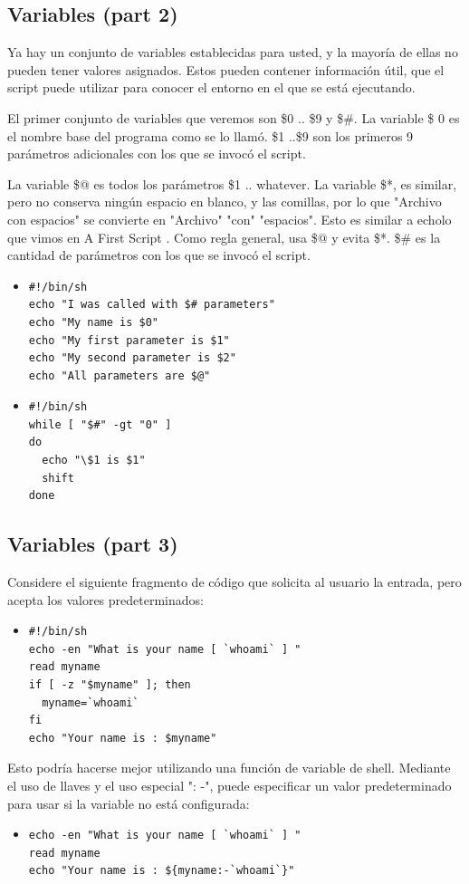 \documentclass[12pt,letterpaper]{article}
\begin{document}
{        \subsection{Variables (part 2)}
        Ya hay un conjunto de variables establecidas para usted, y la mayoría de ellas no pueden tener valores asignados. 
Estos pueden contener información útil, que el script puede utilizar para conocer el entorno en el que se está ejecutando.\par
El primer conjunto de variables que veremos son \$0 .. \$9 y \$\#. 
La variable \$ 0 es el nombre base del programa como se lo llamó.
\$1 ..\$9 son los primeros 9 parámetros adicionales con los que se invocó el script. \par
La variable \$@ es todos los parámetros \$1 .. whatever. La variable \$*, es similar, pero no conserva ningún espacio en blanco, y las comillas, por lo que "Archivo con espacios" se convierte en "Archivo" "con" "espacios". Esto es similar a echolo que vimos en A First Script . Como regla general, usa \$@ y evita \$*.  
\$\# es la cantidad de parámetros con los que se invocó el script.
	\color{red}
        \begin{itemize}
        \item \begin{verbatim}
#!/bin/sh
echo "I was called with $# parameters"
echo "My name is $0"
echo "My first parameter is $1"
echo "My second parameter is $2"
echo "All parameters are $@"
        \end{verbatim}
        \item \begin{verbatim}
#!/bin/sh
while [ "$#" -gt "0" ]
do
  echo "\$1 is $1"
  shift
done   
        \end{verbatim}
        \end{itemize}
        \color{black}
        \subsection{Variables (part 3)}
        Considere el siguiente fragmento de código que solicita al usuario la entrada, pero acepta los valores predeterminados:
        \color{red}
        \begin{itemize}
        \item \begin{verbatim}
#!/bin/sh
echo -en "What is your name [ `whoami` ] "
read myname
if [ -z "$myname" ]; then
  myname=`whoami`
fi
echo "Your name is : $myname"
        \end{verbatim}
        \end{itemize}
        \color{black}
        Esto podría hacerse mejor utilizando una función de variable de shell. Mediante el uso de llaves y el uso especial ": -", puede especificar un valor predeterminado para usar si la variable no está configurada:
        \color{red}
        \begin{itemize}
        \item \begin{verbatim}
echo -en "What is your name [ `whoami` ] "
read myname
echo "Your name is : ${myname:-`whoami`}"
        \end{verbatim}
        \end{itemize}
        \color{black}
}
\end{document}
